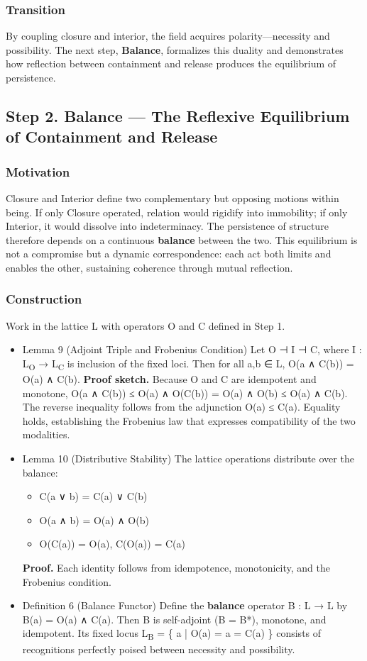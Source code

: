 \documentclass[11pt]{article}
\begin{document}
\subsubsection*{Transition}
\label{sec:org664b5f3}
By coupling closure and interior, the field acquires polarity—necessity and possibility.  
The next step, \textbf{Balance}, formalizes this duality and demonstrates how reflection between containment and release produces the equilibrium of persistence.
\subsection*{Step 2. Balance — The Reflexive Equilibrium of Containment and Release}
\label{sec:orgee1fe66}

\subsubsection*{Motivation}
\label{sec:org98b7d0d}
Closure and Interior define two complementary but opposing motions within being.  
If only Closure operated, relation would rigidify into immobility;  
if only Interior, it would dissolve into indeterminacy.  
The persistence of structure therefore depends on a continuous \textbf{balance} between the two.  
This equilibrium is not a compromise but a dynamic correspondence:  
each act both limits and enables the other, sustaining coherence through mutual reflection.
\subsubsection*{Construction}
\label{sec:org6e05248}
Work in the lattice L with operators O and C defined in Step 1.
\begin{itemize}
\item Lemma 9 (Adjoint Triple and Frobenius Condition)
\label{sec:org910c4d5}
Let O ⊣ I ⊣ C, where I : L\textsubscript{O} → L\textsubscript{C} is inclusion of the fixed loci.  
Then for all a,b ∈ L,  
O(a ∧ C(b)) = O(a) ∧ C(b).  
\textbf{Proof sketch.}  
Because O and C are idempotent and monotone,  
O(a ∧ C(b)) ≤ O(a) ∧ O(C(b)) = O(a) ∧ O(b) ≤ O(a) ∧ C(b).  
The reverse inequality follows from the adjunction O(a) ≤ C(a).  
Equality holds, establishing the Frobenius law that expresses compatibility of the two modalities.
\item Lemma 10 (Distributive Stability)
\label{sec:org8212b24}
The lattice operations distribute over the balance:
\begin{itemize}
\item C(a ∨ b) = C(a) ∨ C(b)
\item O(a ∧ b) = O(a) ∧ O(b)
\item O(C(a)) = O(a),  C(O(a)) = C(a)
\end{itemize}
\textbf{Proof.}  Each identity follows from idempotence, monotonicity, and the Frobenius condition.
\item Definition 6 (Balance Functor)
\label{sec:org9ccaa49}
Define the \textbf{balance} operator B : L → L by  
B(a) = O(a) ∧ C(a).  
Then B is self-adjoint (B = B*), monotone, and idempotent.  
Its fixed locus L\textsubscript{B} = \{ a | O(a) = a = C(a) \}  
consists of recognitions perfectly poised between necessity and possibility.
\end{itemize}
\end{document}
